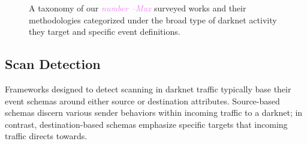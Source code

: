 \documentclass[manuscript,nonacm]{acmart}
\newcommand{\maxnote}[1]{\textit{\textcolor{violet}{#1 --Max}}}
\begin{document}

\begin{figure}
    \caption{A taxonomy of our \maxnote{number} surveyed works and their methodologies categorized under the broad type of darknet activity they target and specific event definitions.}
    \label{fig:taxonomy}
\end{figure}

\subsection{Scan Detection}

Frameworks designed to detect scanning in darknet traffic typically base their event schemas around either source or destination attributes.
Source-based schemas discern various sender behaviors within incoming traffic to a darknet; in contrast, destination-based schemas emphasize specific targets that incoming traffic directs towards.
\vspace{0.25em}

\end{document}
